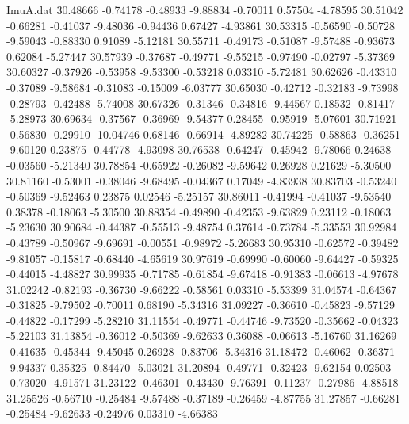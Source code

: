 \begin{filecontents}{ImuA.dat}
  30.48666   -0.74178   -0.48933   -9.88834   -0.70011    0.57504   -4.78595
  30.51042   -0.66281   -0.41037   -9.48036   -0.94436    0.67427   -4.93861
  30.53315   -0.56590   -0.50728   -9.59043   -0.88330    0.91089   -5.12181
  30.55711   -0.49173   -0.51087   -9.57488   -0.93673    0.62084   -5.27447
  30.57939   -0.37687   -0.49771   -9.55215   -0.97490   -0.02797   -5.37369
  30.60327   -0.37926   -0.53958   -9.53300   -0.53218    0.03310   -5.72481
  30.62626   -0.43310   -0.37089   -9.58684   -0.31083   -0.15009   -6.03777
  30.65030   -0.42712   -0.32183   -9.73998   -0.28793   -0.42488   -5.74008
  30.67326   -0.31346   -0.34816   -9.44567    0.18532   -0.81417   -5.28973
  30.69634   -0.37567   -0.36969   -9.54377    0.28455   -0.95919   -5.07601
  30.71921   -0.56830   -0.29910  -10.04746    0.68146   -0.66914   -4.89282
  30.74225   -0.58863   -0.36251   -9.60120    0.23875   -0.44778   -4.93098
  30.76538   -0.64247   -0.45942   -9.78066    0.24638   -0.03560   -5.21340
  30.78854   -0.65922   -0.26082   -9.59642    0.26928    0.21629   -5.30500
  30.81160   -0.53001   -0.38046   -9.68495   -0.04367    0.17049   -4.83938
  30.83703   -0.53240   -0.50369   -9.52463    0.23875    0.02546   -5.25157
  30.86011   -0.41994   -0.41037   -9.53540    0.38378   -0.18063   -5.30500
  30.88354   -0.49890   -0.42353   -9.63829    0.23112   -0.18063   -5.23630
  30.90684   -0.44387   -0.55513   -9.48754    0.37614   -0.73784   -5.33553
  30.92984   -0.43789   -0.50967   -9.69691   -0.00551   -0.98972   -5.26683
  30.95310   -0.62572   -0.39482   -9.81057   -0.15817   -0.68440   -4.65619
  30.97619   -0.69990   -0.60060   -9.64427   -0.59325   -0.44015   -4.48827
  30.99935   -0.71785   -0.61854   -9.67418   -0.91383   -0.06613   -4.97678
  31.02242   -0.82193   -0.36730   -9.66222   -0.58561    0.03310   -5.53399
  31.04574   -0.64367   -0.31825   -9.79502   -0.70011    0.68190   -5.34316
  31.09227   -0.36610   -0.45823   -9.57129   -0.44822   -0.17299   -5.28210
  31.11554   -0.49771   -0.44746   -9.73520   -0.35662   -0.04323   -5.22103
  31.13854   -0.36012   -0.50369   -9.62633    0.36088   -0.06613   -5.16760
  31.16269   -0.41635   -0.45344   -9.45045    0.26928   -0.83706   -5.34316
  31.18472   -0.46062   -0.36371   -9.94337    0.35325   -0.84470   -5.03021
  31.20894   -0.49771   -0.32423   -9.62154    0.02503   -0.73020   -4.91571
  31.23122   -0.46301   -0.43430   -9.76391   -0.11237   -0.27986   -4.88518
  31.25526   -0.56710   -0.25484   -9.57488   -0.37189   -0.26459   -4.87755
  31.27857   -0.66281   -0.25484   -9.62633   -0.24976    0.03310   -4.66383

\end{filecontents}
